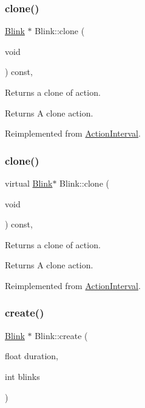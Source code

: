 \subsubsection{\texorpdfstring{clone()}{clone()}\hspace{0.1cm}{\footnotesize\ttfamily [1/2]}}
{\footnotesize\ttfamily \hyperlink{classBlink}{Blink} $\ast$ Blink\+::clone (\begin{DoxyParamCaption}\item[{void}]{ }\end{DoxyParamCaption}) const\hspace{0.3cm}{\ttfamily [override]}, {\ttfamily [virtual]}}

Returns a clone of action.

\begin{DoxyReturn}{Returns}
A clone action. 
\end{DoxyReturn}


Reimplemented from \hyperlink{classActionInterval_abc93ce0c2f54a90eb216a7803f25f44a}{Action\+Interval}.

\mbox{\label{classBlink_afb2d2eb745a9a3ea9f157fd9e83ca19a}} 
\subsubsection{\texorpdfstring{clone()}{clone()}\hspace{0.1cm}{\footnotesize\ttfamily [2/2]}}
{\footnotesize\ttfamily virtual \hyperlink{classBlink}{Blink}$\ast$ Blink\+::clone (\begin{DoxyParamCaption}\item[{void}]{ }\end{DoxyParamCaption}) const\hspace{0.3cm}{\ttfamily [override]}, {\ttfamily [virtual]}}

Returns a clone of action.

\begin{DoxyReturn}{Returns}
A clone action. 
\end{DoxyReturn}


Reimplemented from \hyperlink{classActionInterval_abc93ce0c2f54a90eb216a7803f25f44a}{Action\+Interval}.

\mbox{\label{classBlink_a283462c9ff5a6c4fcd33ad9f125a8f8b}} 
\subsubsection{\texorpdfstring{create()}{create()}\hspace{0.1cm}{\footnotesize\ttfamily [1/2]}}
{\footnotesize\ttfamily \hyperlink{classBlink}{Blink} $\ast$ Blink\+::create (\begin{DoxyParamCaption}\item[{float}]{duration,  }\item[{int}]{blinks }\end{DoxyParamCaption})\hspace{0.3cm}{\ttfamily [static]}}

